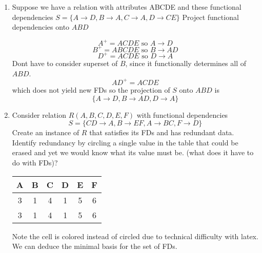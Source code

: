 \documentclass[11pt]{article}
\begin{document}
\begin{enumerate}
    \item Suppose we have a relation with attributes ABCDE and these functional dependencies $S = \{ A \to D, B\to A, C\to A, D\to CE \}$ Project functional dependencies onto $ABD$
    \begin{solution}
        \[
            A^+ = ACDE \text{  so  } A \to D
        \]
        \[
            B^+ = ABCDE \text{  so  } B \to AD
        \]
        \[
            D^+ = ACDE \text{  so  } D \to A
        \]
        Dont have to consider superset of $B$, since it functionally determines all of $ABD$. 
        \[
            AD^+ = ACDE 
        \]
        which does not yield new FDs so the projection of $S$ onto $ABD$ is 
        \[
            \{  A \to D, B \to AD, D\to A \}
        \]
    \end{solution}
    \item Consider relation $R(A,B,C,D,E,F)$ with functional dependencies 
    \[
        S = \{ CD \to A, B \to EF, A\to BC, F\to D \}
    \]
    Create an instance of $R$ that satisfies its FDs and has redundant data. Identify redundancy by circling a single value in the table that could be erased and yet we would know what its value must be. (what does it have to do with FDs)? 
    \begin{solution}
        \begin{center}
        \begin{tabular}{ || c | c | c | c | c | c|| }    A & B & C & D & E & F \\ 
            \hline
            3 & 1 & 4 & {\color{red} 1} & 5 & 6 \\ 
            3 & 1 & 4 & 1 & 5 & 6 \\ 
            \hline
        \end{tabular}
        \end{center}
        Note the cell is colored instead of circled due to technical difficulty with latex. We can deduce the minimal basis for the set of FDs. 
    \end{solution}
\end{enumerate}
\end{document}

